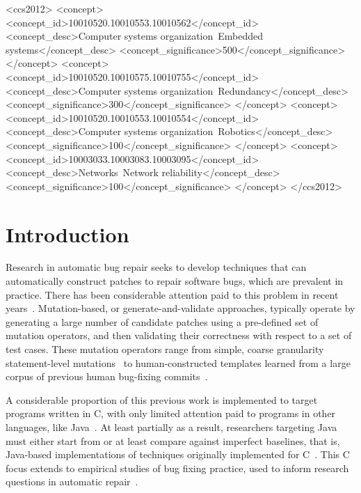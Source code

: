 \documentclass{sig-alternate-05-2015}
\begin{document}
%
%
\begin{CCSXML}
<ccs2012>
 <concept>
  <concept_id>10010520.10010553.10010562</concept_id>
  <concept_desc>Computer systems organization~Embedded systems</concept_desc>
  <concept_significance>500</concept_significance>
 </concept>
 <concept>
  <concept_id>10010520.10010575.10010755</concept_id>
  <concept_desc>Computer systems organization~Redundancy</concept_desc>
  <concept_significance>300</concept_significance>
 </concept>
 <concept>
  <concept_id>10010520.10010553.10010554</concept_id>
  <concept_desc>Computer systems organization~Robotics</concept_desc>
  <concept_significance>100</concept_significance>
 </concept>
 <concept>
  <concept_id>10003033.10003083.10003095</concept_id>
  <concept_desc>Networks~Network reliability</concept_desc>
  <concept_significance>100</concept_significance>
 </concept>
</ccs2012>  
\end{CCSXML}


%
%

%
%
\printccsdesc



\section{Introduction}

Research in automatic bug repair seeks to develop techniques that can
automatically construct patches to repair software bugs, which are prevalent in
practice. There has been considerable attention paid to this problem in recent
years~\cite{kim2013,weimer2009,legoues2012,pan2009,so,many,more}.
Mutation-based, or generate-and-validate approaches, typically operate by
generating a large number of candidate patches using a pre-defined set of
mutation operators, and then validating their correctness with respect to a set
of test cases.  These mutation operators range from simple, coarse granularity
statement-level mutations~\cite{examples} to human-constructed templates learned
from a large corpus of previous human bug-fixing commits~\cite{kim2013}.

A considerable proportion of this previous work is implemented to target
programs written in C, with only limited attention paid to programs in other
languages, like Java~\cite{kim2013}.  At least partially as a result,
researchers targeting Java must either start from or at least compare against
imperfect baselines, that is, Java-based implementations of techniques
originally implemented for C~\cite{nopol}. %
This C focus extends to empirical studies
of bug fixing practice, used to inform research questions in automatic
repair~\cite{zhong2015}. 
\end{document}
